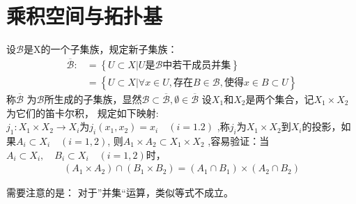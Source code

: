\section{乘积空间与拓扑基}
设\(\mathscr{B}\)是X的一个子集族，规定新子集族：
\begin{align}\label{拓扑基定义}
    \overline{\mathscr{B}} :&= \left\{U \subset X | U \text{是} \mathscr{B} \text{中若干成员并集}\right\} \\
    &=\left\{ U \subset X | \forall x \in U ,\text{存在} B \in \mathscr{B},\text{使得} x \in B \subset U \right\}
\end{align}
称\(\overline{\mathscr{B}}\) 为\(\mathscr{B}\)所生成的子集族，显然\(\mathscr{B} \subset \overline{\mathscr{B}}, \emptyset \in \overline{\mathscr{B}}\)
设\(X_1\)和\(X_2\)是两个集合，记\(X_1 \times X_2\)为它们的笛卡尔积， 规定如下映射: \\ 
\(j_1: X_1 \times X_2 \rightarrow X_i \)为\(j_i(x_1,x_2) = x_i \quad (i=1.2)\) ,称\(j_i\)为\(X_1 \times X_2 \)到\(X_i\)的投影，如果\(A_i \subset X_i \quad (i=1,2)\), 则\(A_1 \times A_2 \subset X_1 \times X_2\) ,容易验证：当\(A_i \subset X_i,\quad B_i \subset X_i \quad (i=1,2)\)时，\begin{align}
    (A_1 \times A_2) \cap (B_1 \times B_2) = (A_1 \cap B_1 ) \times (A_2 \cap B_2) 
\end{align}
\begin{note}
    需要注意的是： 对于”并集“运算，类似等式不成立。
\end{note}
